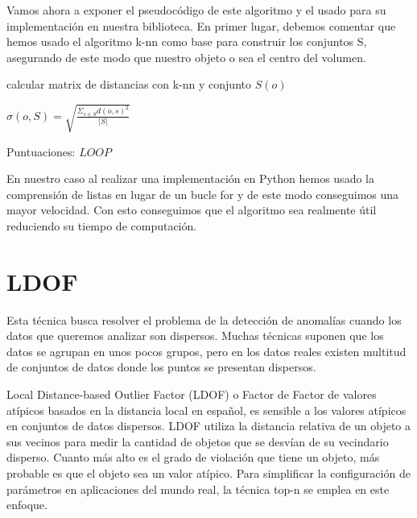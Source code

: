 Vamos ahora a exponer el pseudocódigo de este algoritmo y el usado para su
implementación en nuestra biblioteca. En primer lugar, debemos comentar que
hemos usado el algoritmo k-nn como base para construir los conjuntos S,
asegurando de este modo que nuestro objeto o sea el centro del volumen.

\begin{codigo}
    \begin{algorithmic}[1]
    \State \parbox[t]{305pt}{calcular matrix de distancias con k-nn y conjunto $S(o)$}
    \State \parbox[t]{305pt}{ $ \sigma(o,S) = \sqrt{ \frac{\Sigma_{s \in S} d(o,s)^2 }{|S|} } $}
    \EndFor
    \State \Return Puntuaciones: $LOOP$
    \EndFunction 
    \end{algorithmic}
\end{codigo}

En nuestro caso al realizar una implementación en Python hemos usado la comprensión
de listas en lugar de un bucle for y de este modo conseguimos una mayor velocidad.
Con esto conseguimos que el algoritmo sea realmente útil reduciendo su tiempo
de computación.


\section{LDOF}
Esta técnica busca resolver el problema de la detección de anomalías cuando los 
datos que queremos analizar son dispersos. Muchas técnicas suponen que los datos
se agrupan en unos pocos grupos, pero en los datos reales existen multitud de conjuntos
de datos donde los puntos se presentan dispersos.


Local Distance-based Outlier Factor (LDOF) o Factor de Factor de valores atípicos 
basados en la distancia local en español, es sensible a los valores atípicos en 
conjuntos de datos dispersos. LDOF utiliza la distancia relativa de un 
objeto a sus vecinos para medir la cantidad de objetos que se desvían de 
su vecindario disperso. Cuanto más alto es el grado de violación que 
tiene un objeto, más probable es que el objeto sea un valor atípico. 
Para simplificar la configuración de parámetros en aplicaciones del mundo
real, la técnica top-n se emplea en este enfoque.

